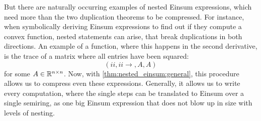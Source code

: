 But there are naturally occurring examples of nested Einsum expressions, which need more than the two duplication theorems to be compressed.
For instance, when symbolically deriving Einsum expressions to find out if they compute a convex function,
nested statements can arise, that break duplications in both directions.
An example of a function, where this happens in the second derivative, is the trace of a matrix where all entries have been squared:
$$(ii,ii \rightarrow, A, A)$$
for some $A \in \mathbb{R}^{n \times n}$.
Now, with \cref{thm:nested_einsum:general}, this procedure allows us to compress even these expressions.
Generally, it allows us to write every computation, where the single steps can be translated to Einsum over a single semiring, as one big Einsum expression that does not blow up in size with levels of nesting.